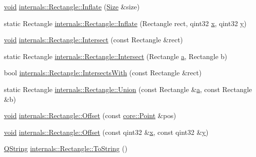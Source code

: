\begin{DoxyCompactItemize}
\item 
\hyperlink{group___u_a_v_objects_plugin_ga444cf2ff3f0ecbe028adce838d373f5c}{void} \hyperlink{group___o_p_map_widget_ga60b97161857418ee4ec8a2def48176e8}{internals\-::\-Rectangle\-::\-Inflate} (\hyperlink{structcore_1_1_size}{\-Size} \&size)
\item 
static \-Rectangle \hyperlink{group___o_p_map_widget_ga2968ca81b2ca433a710253f3c6168d36}{internals\-::\-Rectangle\-::\-Inflate} (\-Rectangle rect, qint32 \hyperlink{_o_p_plots_8m_a9336ebf25087d91c818ee6e9ec29f8c1}{x}, qint32 \hyperlink{_o_p_plots_8m_a2fb1c5cf58867b5bbc9a1b145a86f3a0}{y})
\item 
\hyperlink{group___u_a_v_objects_plugin_ga444cf2ff3f0ecbe028adce838d373f5c}{void} \hyperlink{group___o_p_map_widget_ga1eacc8faeb8cf4c202dc6eb3a2cd7482}{internals\-::\-Rectangle\-::\-Intersect} (const \-Rectangle \&rect)
\item 
static \-Rectangle \hyperlink{group___o_p_map_widget_ga6d1eb93d1aabfc6ef4c65cf4e81ea6c2}{internals\-::\-Rectangle\-::\-Intersect} (\-Rectangle \hyperlink{_o_p_plots_8m_ab6991d210d93a78cdbdf6de1889c1259}{a}, \-Rectangle b)
\item 
bool \hyperlink{group___o_p_map_widget_gae5e839ee40fb95a93687ee17445de718}{internals\-::\-Rectangle\-::\-Intersects\-With} (const \-Rectangle \&rect)
\item 
static \-Rectangle \hyperlink{group___o_p_map_widget_ga9a93d2cc4abc1f3c2b053dca4311fd33}{internals\-::\-Rectangle\-::\-Union} (const \-Rectangle \&\hyperlink{_o_p_plots_8m_ab6991d210d93a78cdbdf6de1889c1259}{a}, const \-Rectangle \&b)
\item 
\hyperlink{group___u_a_v_objects_plugin_ga444cf2ff3f0ecbe028adce838d373f5c}{void} \hyperlink{group___o_p_map_widget_ga66c531d30a3208df417c71ee0cb3ce72}{internals\-::\-Rectangle\-::\-Offset} (const \hyperlink{structcore_1_1_point}{core\-::\-Point} \&pos)
\item 
\hyperlink{group___u_a_v_objects_plugin_ga444cf2ff3f0ecbe028adce838d373f5c}{void} \hyperlink{group___o_p_map_widget_gaa8fc3eba71f76d8e6264cd610bb11952}{internals\-::\-Rectangle\-::\-Offset} (const qint32 \&\hyperlink{_o_p_plots_8m_a9336ebf25087d91c818ee6e9ec29f8c1}{x}, const qint32 \&\hyperlink{_o_p_plots_8m_a2fb1c5cf58867b5bbc9a1b145a86f3a0}{y})
\item 
\hyperlink{group___u_a_v_objects_plugin_gab9d252f49c333c94a72f97ce3105a32d}{\-Q\-String} \hyperlink{group___o_p_map_widget_gacc8a6c81527141fc59b3ba245b35c297}{internals\-::\-Rectangle\-::\-To\-String} ()
\item 

\end{DoxyCompactItemize}

